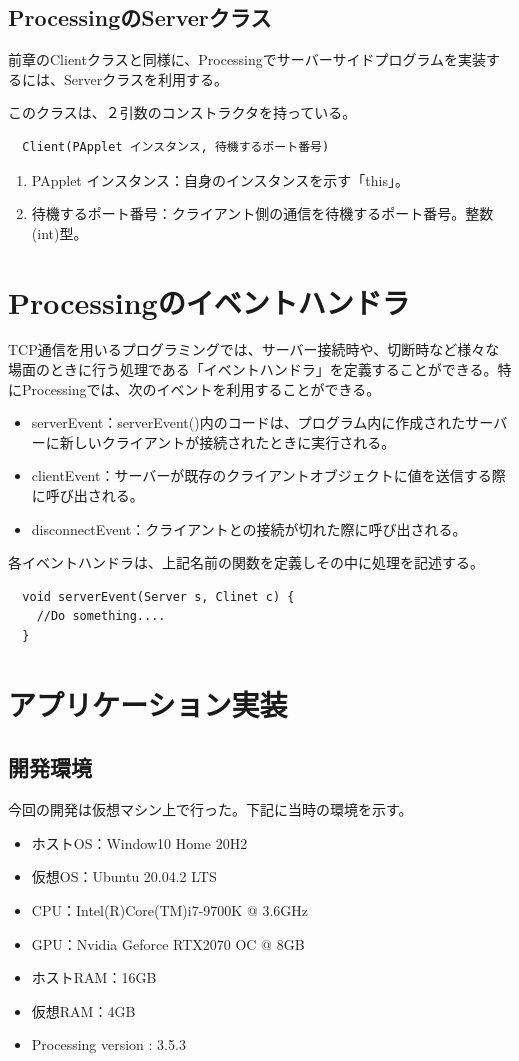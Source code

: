 \documentclass[dvipdfmx]{jsarticle}
\begin{document}
\subsection{ProcessingのServerクラス}
前章のClientクラスと同様に、Processingでサーバーサイドプログラムを実装するには、Serverクラスを利用する。\par
このクラスは、２引数のコンストラクタを持っている。
\begin{verbatim}
  Client(PApplet インスタンス, 待機するポート番号)
\end{verbatim}
\begin{enumerate}
  \item PApplet インスタンス：自身のインスタンスを示す「this」。
  \item 待機するポート番号：クライアント側の通信を待機するポート番号。整数(int)型。
\end{enumerate}
\section{Processingのイベントハンドラ}
TCP通信を用いるプログラミングでは、サーバー接続時や、切断時など様々な場面のときに行う処理である「イベントハンドラ」を定義することができる。特にProcessingでは、次のイベントを利用することができる。\par
\begin{itemize}
  \item serverEvent：serverEvent()内のコードは、プログラム内に作成されたサーバーに新しいクライアントが接続されたときに実行される。
  \item clientEvent：サーバーが既存のクライアントオブジェクトに値を送信する際に呼び出される。
  \item disconnectEvent：クライアントとの接続が切れた際に呼び出される。
\end{itemize}
各イベントハンドラは、上記名前の関数を定義しその中に処理を記述する。
\begin{verbatim}
  void serverEvent(Server s, Clinet c) {
    //Do something....
  }
\end{verbatim}

\section{アプリケーション実装}
\subsection{開発環境}
今回の開発は仮想マシン上で行った。下記に当時の環境を示す。
\begin{itemize}
  \item ホストOS：Window10 Home 20H2
  \item 仮想OS：Ubuntu 20.04.2 LTS
  \item CPU：Intel(R)Core(TM)i7-9700K @ 3.6GHz
  \item GPU：Nvidia Geforce RTX2070 OC @ 8GB
  \item ホストRAM：16GB
  \item 仮想RAM：4GB
  \item Processing version : 3.5.3
\end{itemize}
\end{document}
